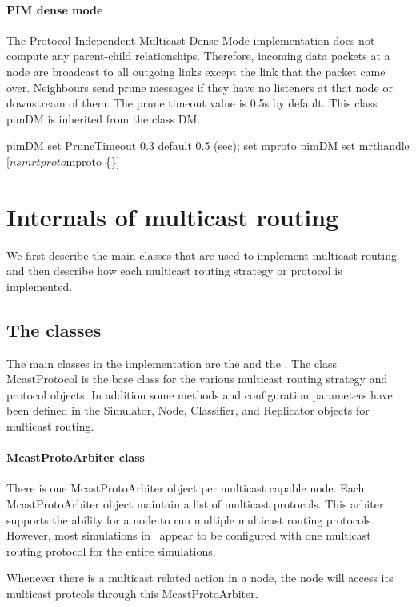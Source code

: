 {\paragraph{PIM dense mode}
The Protocol Independent Multicast Dense Mode implementation
does not compute any parent-child relationships.
Therefore, incoming  data packets at a node are broadcast
to all outgoing links except the link that the packet came over.
Neighbours send prune messages if they have no listeners
at that node or downstream of them.
The prune timeout value is 0.5s by default.
This class pimDM is inherited from the class DM.
\begin{program}
        pimDM set PruneTimeout  0.3	\; default 0.5 (sec);
	set mproto pimDM
	set mrthandle [$ns mrtproto $mproto \{\}]
\end{program}

\section{Internals of multicast routing}
\label{sec:mcast-internals}

We first describe the main classes that are used to implement multicast
routing and then describe how each multicast routing strategy
or protocol is implemented.

\subsection{The classes}
The main classes in the implementation are
the  and
the .
The class McastProtocol is the base
class for the various multicast routing strategy and protocol objects.
In addition some methods and configuration parameters have been defined in
the Simulator, Node, Classifier, and Replicator objects for multicast
routing.

\paragraph{McastProtoArbiter class}
There is one McastProtoArbiter object per multicast capable node.
Each  McastProtoArbiter object maintain a list of multicast protocols.
This arbiter supports the ability for a node to run multiple multicast
routing protocols.
However, most simulations in \ns\ appear to be
configured with one multicast routing protocol for the entire simulations.

Whenever there is a multicast related action in a node, the
node will access its multicast protcols through this McastProtoArbiter.

}
